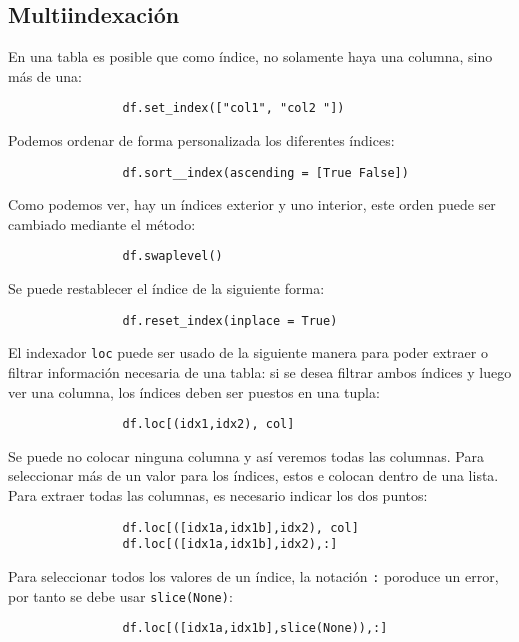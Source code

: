         \subsection{Multiindexación}
            En una tabla es posible que como índice, no solamente haya una columna, sino más de una:
            \begin{verbatim}
                df.set_index(["col1", "col2 "])
            \end{verbatim}
            Podemos ordenar de forma personalizada los diferentes índices:
            \begin{verbatim}
                df.sort__index(ascending = [True False])
            \end{verbatim}
            Como podemos ver, hay un índices exterior y uno interior, este orden puede ser cambiado mediante el método:
            \begin{verbatim}
                df.swaplevel()
            \end{verbatim}
            Se puede restablecer el índice de la siguiente forma:
            \begin{verbatim}
                df.reset_index(inplace = True)
            \end{verbatim}
            El indexador \texttt{loc} puede ser usado de la siguiente manera para poder extraer o filtrar información necesaria de una tabla:
            si se desea filtrar ambos índices y luego ver una columna, los índices deben ser puestos en una tupla:
            \begin{verbatim}
                df.loc[(idx1,idx2), col]
            \end{verbatim}
            Se puede no colocar ninguna columna y así veremos todas las columnas.
            Para seleccionar más de un valor para los índices, estos e colocan dentro de una lista. Para extraer todas las columnas, es necesario indicar los dos puntos:
            \begin{verbatim}
                df.loc[([idx1a,idx1b],idx2), col]
                df.loc[([idx1a,idx1b],idx2),:]
            \end{verbatim}
            Para seleccionar todos los valores de un índice, la notación \texttt{:} poroduce un error, por tanto se debe usar \texttt{slice(None)}:
            \begin{verbatim}
                df.loc[([idx1a,idx1b],slice(None)),:]
            \end{verbatim}

